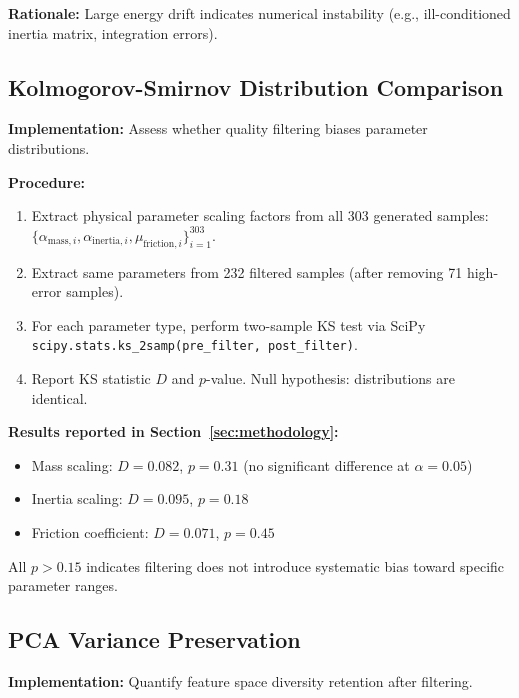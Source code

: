 \documentclass[a4paper]{cas-sc}
\begin{document}
\textbf{Rationale:} Large energy drift indicates numerical instability (e.g., ill-conditioned inertia matrix, integration errors).

\subsection{Kolmogorov-Smirnov Distribution Comparison}

\textbf{Implementation:} Assess whether quality filtering biases parameter distributions.

\textbf{Procedure:}
\begin{enumerate}[leftmargin=*, itemsep=1pt]
    \item Extract physical parameter scaling factors from all 303 generated samples: $\{\alpha_{\text{mass},i}, \alpha_{\text{inertia},i}, \mu_{\text{friction},i}\}_{i=1}^{303}$.
    \item Extract same parameters from 232 filtered samples (after removing 71 high-error samples).
    \item For each parameter type, perform two-sample KS test via SciPy \texttt{scipy.stats.ks\_2samp(pre\_filter, post\_filter)}.
    \item Report KS statistic $D$ and $p$-value. Null hypothesis: distributions are identical.
\end{enumerate}

\textbf{Results reported in Section~\ref{sec:methodology}:}
\begin{itemize}[leftmargin=*, itemsep=1pt]
    \item Mass scaling: $D=0.082$, $p=0.31$ (no significant difference at $\alpha=0.05$)
    \item Inertia scaling: $D=0.095$, $p=0.18$
    \item Friction coefficient: $D=0.071$, $p=0.45$
\end{itemize}
All $p > 0.15$ indicates filtering does not introduce systematic bias toward specific parameter ranges.

\subsection{PCA Variance Preservation}

\textbf{Implementation:} Quantify feature space diversity retention after filtering.
\end{document}

